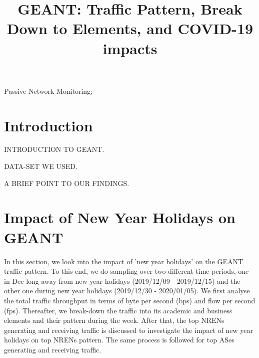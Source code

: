 \documentclass[10pt, journal, letterpaper]{IEEEtran}
\begin{document}
\title{GEANT: Traffic Pattern, Break Down to Elements, and COVID-19 impacts}
\author{}
\maketitle	
\begin{abstract}
\end{abstract}	
\begin{IEEEkeywords} 
    Passive Network Monitoring;
\end{IEEEkeywords}

\section{Introduction}
INTRODUCTION TO GEANT.

DATA-SET WE USED.

A BRIEF POINT TO OUR FINDINGS.

\section{Impact of New Year Holidays on GEANT}
In this section, we look into the impact of 'new year holidays' on the GEANT traffic pattern. To this end, we do sampling over two different time-periods, one in Dec long away from new year holidays (2019/12/09 - 2019/12/15) and the other one during new year holidays (2019/12/30 - 2020/01/05). We first analyse the total traffic throughput in terms of byte per second (bps) and flow per second (fps). Thereafter, we break-down the traffic into its academic and business elements and their pattern during the week. After that, the top NRENs generating and receiving traffic is discussed to investigate the impact of new year holidays on top NRENs pattern. The same process is followed for top ASes generating and receiving traffic.
\end{document}
